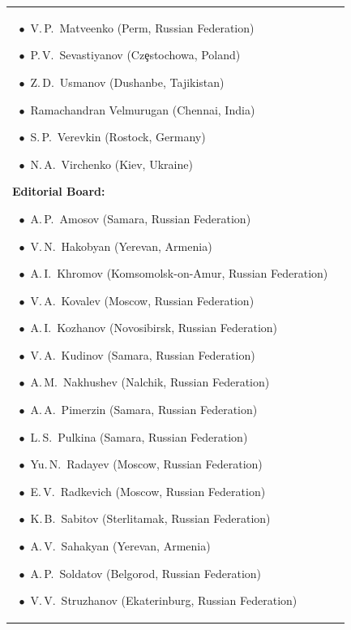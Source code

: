\begin{table}[t!]
\begin{tabular}{p{7.4cm}p{5.6cm}}
{$~~\bullet$ V.\,P.~Matveenko (Perm, Russian Federation) \par
$~~\bullet$ P.\,V.~Sevastiyanov (Cz\c{e}stochowa, Poland)  \par
$~~\bullet$ Z.\,D.~Usmanov  (Dushanbe, Tajikistan) \par
$~~\bullet$ Ramachandran Velmurugan  (Chennai, India) \par
$~~\bullet$ S.\,P.~Verevkin  (Rostock, Germany) \par
$~~\bullet$ N.\,A.~Virchenko (Kiev, Ukraine) \par\bigskip
\textbf{Editorial Board:} \par \smallskip
$~~\bullet$ A.\,P.~Amosov (Samara, Russian Federation) \par 
$~~\bullet$ V.\,N.~Hakobyan (Yerevan, Armenia)\par 
$~~\bullet$ A.\,I.~Khromov (Komsomolsk-on-Amur, Russian Federation)\par
$~~\bullet$ V.\,A.~Kovalev (Moscow, Russian Federation)\par
$~~\bullet$ A.\,I.~Kozhanov (Novosibirsk, Russian Federation) \par 
$~~\bullet$ V.\,A.~Kudinov (Samara, Russian Federation) \par 
$~~\bullet$ A.\,M.~Nakhushev (Nalchik, Russian Federation)\par 
$~~\bullet$ A.\,A.~Pimerzin (Samara, Russian Federation) \par
$~~\bullet$ L.\,S.~Pulkina (Samara, Russian Federation)\par
$~~\bullet$ Yu.\,N.~Radayev  (Moscow, Russian Federation)\par
$~~\bullet$ E.\,V.~Radkevich (Moscow, Russian Federation)\par
$~~\bullet$ K.\,B.~Sabitov  (Sterlitamak, Russian Federation)\par
$~~\bullet$ A.\,V.~Sahakyan (Yerevan, Armenia)\par 
$~~\bullet$ A.\,P.~Soldatov (Belgorod, Russian Federation)\par
$~~\bullet$ V.\,V.~Struzhanov (Ekaterinburg, Russian Federation)\par 
}\\
\end{tabular}
\end{table}


